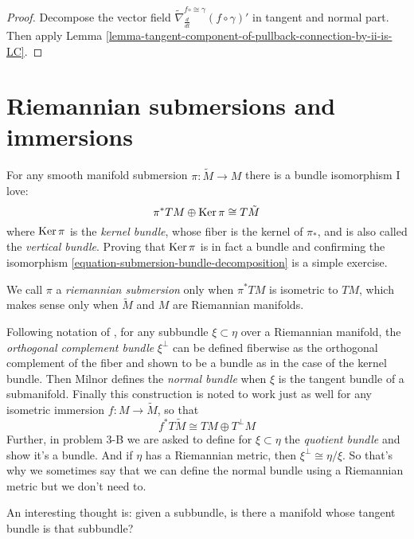 \begin{proof}
Decompose the vector field 
$\tilde{\nabla}^{f\circ\cong\gamma}_{\frac{d}{dt}}(f\circ\gamma)'$ in tangent and
normal part. Then apply Lemma 
\ref{lemma-tangent-component-of-pullback-connection-by-ii-is-LC}.
\end{proof}

\section{Riemannian submersions and immersions}
\label{section-Riemannian-submersions-and-immersions}

For any smooth manifold submersion $\pi:\tilde{M}\to M$ there is a bundle
isomorphism I love: 
\begin{equation}
\label{equation-submersion-bundle-decomposition}
\pi^*TM \oplus \mathop{\mathrm{Ker}} \pi\cong
T\tilde{M} \end{equation}
 where $\mathop{\mathrm{Ker}}\pi$ is the {\it kernel bundle}, whose
fiber is the kernel of $\pi_*$, and is also called the {\it vertical bundle}.
Proving that $\mathop{\mathrm{Ker}}\pi$ is in fact a bundle and confirming the isomorphism
\ref{equation-submersion-bundle-decomposition} is a simple exercise.

We call $\pi$ a {\it riemannian submersion} only when $\pi^*TM$ is isometric to
$TM$, which makes sense only when $\tilde{M}$ and $M$ are Riemannian manifolds.

Following notation of \cite{Milnor-Characteristic-Classes}, for any subbundle
$\xi \subset\eta$ over a Riemannian manifold, the {\it orthogonal complement
bundle} $\xi^\perp$ can be defined fiberwise as the orthogonal complement of the
fiber and shown to be a bundle as in the case of the kernel bundle. Then Milnor
defines the {\it normal bundle} when $\xi$ is the tangent bundle of a
submanifold. Finally this construction is noted to work just as well for any
isometric immersion $f:M\to \tilde{M}$, so that
\begin{equation}
\label{equation-immersion-bundle-decomposition}
f^*T\tilde{M}\cong TM\oplus T^\perp M
\end{equation}
Further, in problem 3-B we are asked to define for $\xi \subset \eta$ the {\it
quotient bundle} and show it's a bundle. And if $\eta$ has a Riemannian metric,
then $\xi^\perp\cong\eta/\xi$. So that's why we sometimes say that we can define
the normal bundle using a Riemannian metric but we don't need to.

An interesting thought is: given a subbundle, is there a manifold whose tangent
bundle is that subbundle?

